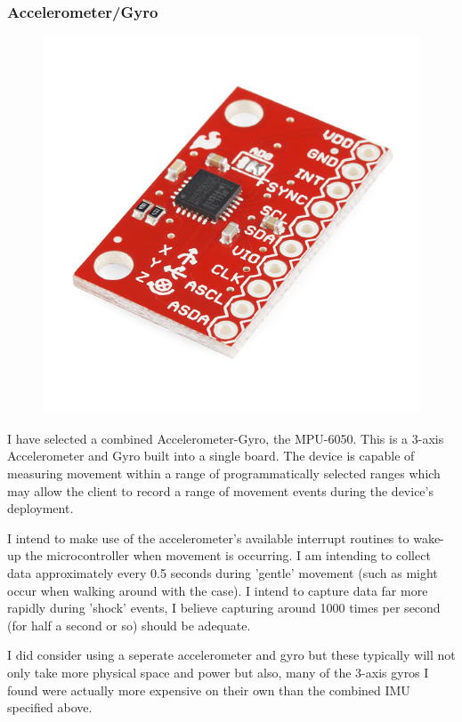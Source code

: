 \documentclass[a4paper, twoside]{article}
\begin{document}
\subsubsection{Accelerometer/Gyro}
\begin{figure}
	\begin{center}
		\includegraphics[scale=0.3]{images/mpu-6050.jpg}
	\end{center}
\end{figure}

I have selected a combined Accelerometer-Gyro, the MPU-6050. This is a 3-axis
Accelerometer and Gyro built into a single board. The device is capable of
measuring movement within a range of programmatically selected ranges which may
allow the client to record a range of movement events during the device's
deployment.

I intend to make use of the accelerometer's available interrupt routines to
wake-up the microcontroller when movement is occurring. I am intending to
collect data approximately every 0.5 seconds during 'gentle' movement (such as
might occur when walking around with the case). I intend to capture data far
more rapidly during 'shock' events, I believe capturing around 1000 times per
second (for half a second or so) should be adequate.

I did consider using a seperate accelerometer and gyro but these typically will
not only take more physical space and power but also, many of the 3-axis gyros I
found were actually more expensive on their own than the combined IMU specified
above.
\end{document}
